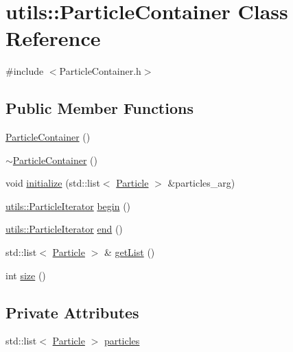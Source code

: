 \hypertarget{classutils_1_1ParticleContainer}{\section{utils\-:\-:Particle\-Container Class Reference}
\label{classutils_1_1ParticleContainer}
}


{\ttfamily \#include $<$Particle\-Container.\-h$>$}

\subsection*{Public Member Functions}
\begin{DoxyCompactItemize}
\item 
\hyperlink{classutils_1_1ParticleContainer_a76d21bdb5141158cf664d65e2d8b1db7}{Particle\-Container} ()
\item 
\hyperlink{classutils_1_1ParticleContainer_a9629a8d31a3aa8c2fe944307c1263b66}{$\sim$\-Particle\-Container} ()
\item 
void \hyperlink{classutils_1_1ParticleContainer_abc060d13bb939123fd0bf1631e0562ca}{initialize} (std\-::list$<$ \hyperlink{classParticle}{Particle} $>$ \&particles\-\_\-arg)
\item 
\hyperlink{classutils_1_1ParticleIterator}{utils\-::\-Particle\-Iterator} \hyperlink{classutils_1_1ParticleContainer_a54e64306f644d9c1d7ac47694592023f}{begin} ()
\item 
\hyperlink{classutils_1_1ParticleIterator}{utils\-::\-Particle\-Iterator} \hyperlink{classutils_1_1ParticleContainer_a9e1b338ace1db41a8f95c69e1bb0817d}{end} ()
\item 
std\-::list$<$ \hyperlink{classParticle}{Particle} $>$ \& \hyperlink{classutils_1_1ParticleContainer_ad3ab05ad52512893f4f251f3219bc11d}{get\-List} ()
\item 
int \hyperlink{classutils_1_1ParticleContainer_ae67310a062690e380c78625b1f944537}{size} ()
\end{DoxyCompactItemize}
\subsection*{Private Attributes}
\begin{DoxyCompactItemize}
\item 
std\-::list$<$ \hyperlink{classParticle}{Particle} $>$ \hyperlink{classutils_1_1ParticleContainer_a112ab237df50a570431ecce15d151e45}{particles}
\end{DoxyCompactItemize}


